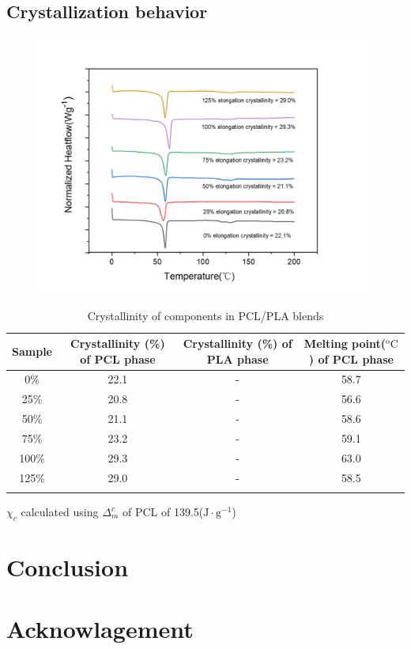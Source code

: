 \documentclass{article}%
\begin{document}
    \subsection{Crystallization behavior}
    \begin{figure} %
      \includegraphics[scale = 0.5]{figures/DSC_result_1.png}
    \end{figure}
    \label{sec:result_and_Analysis}
    \renewcommand{\tablename}{\textbf{Table}}
    \captionsetup[table]{labelsep = period}
    \begin{table} %
      \caption{Crystallinity of components in PCL/PLA blends}
      \begin{tabular}{cccc}
      \toprule
      Sample & Crystallinity (\%) of PCL phase & Crystallinity (\%) of PLA phase & Melting point($\mathrm{^o C}$) of PCL phase\\
      \midrule
      0\% & 22.1 & - & 58.7\\
      25\% & 20.8 & - & 56.6\\
      50\% & 21.1 & - & 58.6\\
      75\% & 23.2 & - & 59.1\\
      100\% & 29.3 & - & 63.0 \\
      125\% & 29.0 & - & 58.5 \\
      \bottomrule
      \label{DSC_result_table}
      \end{tabular}
      $\chi_c $ calculated using $\Delta_m^c$ of PCL of 139.5($\mathrm{J\cdot g^{-1}}$)
    \end{table}
  \section{Conclusion} %
  \label{sec:conclusion}
  
  \section{Acknowlagement} %
  \label{sec:acknowledgement}
  
  
  
\end{document}
